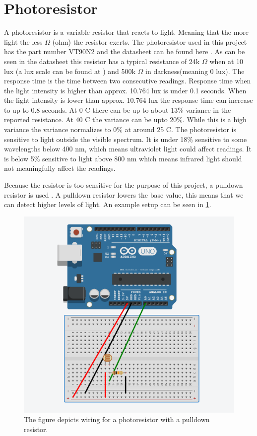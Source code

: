 \section{Photoresistor}
A photoresistor is a variable resistor that reacts to light. Meaning that the more light the less $\Omega$ (ohm) the resistor exerts. The photoresistor used in this project has the part number VT90N2 and the datasheet can be found here \cite{photoresistor_sheet}. As can be seen in the datasheet this resistor has a typical resistance of 24k $\Omega$ when at 10 lux (a lux scale can be found at \cite{lux_scale}) and 500k $\Omega$ in darkness(meaning 0 lux). The response time is the time between two consecutive readings. Response time when the light intensity is higher than approx. 10.764 lux is under 0.1 seconds. When the light intensity is lower than approx. 10.764 lux the response time can increase to up to 0.8 seconds. At 0 \degree C there can be up to about 13\% variance in the reported resistance. At 40 \degree C the variance can be upto 20\%. While this is a high variance the variance normalizes to 0\% at around 25 \degree C. The photoresistor is sensitive to light outside the visible spectrum. It is under 18\% sensitive to some wavelengths below 400 nm, which means ultraviolet light could affect readings. It is below 5\% sensitive to light above 800 nm which means infrared light should not meaningfully affect the readings.

Because the resistor is too sensitive for the purpose of this project, a pulldown resistor is used \cite{pulldown_resistor}. A pulldown resistor lowers the base value, this means that we can detect higher levels of light. An example setup can be seen in \cref{fig:arduino_photoresistor_wiring}.

\begin{figure}[htbp]
  \centering
  \includegraphics[width=\textwidth]{Design/PhotoSensorTests/Images/photoresistor_setup.png}
  \caption{The figure depicts wiring for a photoresistor with a pulldown resistor.}\label{fig:arduino_photoresistor_wiring}
\end{figure}


